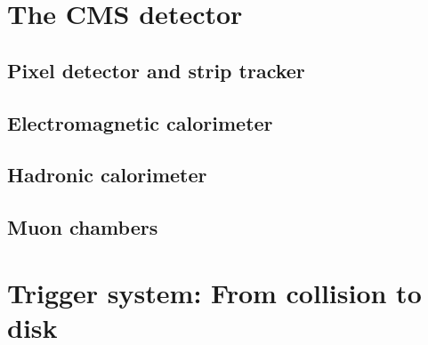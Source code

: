 \section{The CMS detector}
\subsection{Pixel detector and strip tracker}
\subsection{Electromagnetic calorimeter}
\subsection{Hadronic calorimeter}
\subsection{Muon chambers}
\section{Trigger system: From collision to disk}
